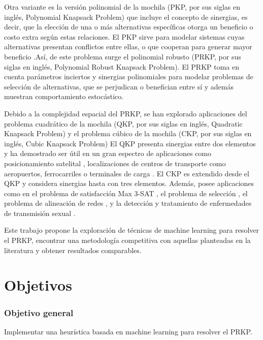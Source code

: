 \documentclass[spanish, a4paper, 12pt, openany,final]{book}
\begin{document}
Otra variante es la versión polinomial de la mochila (PKP, por sus siglas en inglés, Polynomial Knapsack Problem) que incluye el concepto de sinergias, es decir, que la elección de una o más alternativas específicas otorga un beneficio o costo extra según estas relaciones. El PKP sirve para modelar sistemas cuyas alternativas presentan conflictos entre ellas, o que cooperan para generar mayor beneficio \citep{baldo_polynomial_2023}.Así, de este problema surge el polinomial robusto (PRKP, por sus siglas en inglés, Polynomial Robust Knapsack Problem). El PRKP toma en cuenta parámetros inciertos y sinergias polinomiales para modelar problemas de selección de alternativas, que se perjudican o benefician entre sí y además muestran comportamiento estocástico.

Debido a la complejidad espacial del PRKP, se han explorado aplicaciones del problema cuadrático de la mochila (QKP, por sus siglas en inglés, Quadratic Knapsack Problem) \citep{gallo_quadratic_1980} y el problema cúbico de la mochila (CKP, por sus siglas en inglés, Cubic Knapsack Problem) \citep{forrester_strengthening_2022} El QKP presenta sinergias entre dos elementos y ha demostrado ser útil en un gran espectro de aplicaciones como posicionamiento satelital \citep{witzgall_mathematical_1975}, localizaciones de centros de transporte como aeropuertos, ferrocarriles o terminales de carga \citep{rhys_selection_1970}. El CKP es extendido desde el QKP y considera sinergias hasta con tres elementos. Además, posee aplicaciones como en el problema de satisfacción Max 3-SAT \citep{kofler_penalty_2014}, el problema de selección \citep{gallo_fast_1989}, el problema de alineación de redes \citep{mohammadi_triangular_2017}, y la detección y tratamiento de enfermedades de transmisión sexual \citep{zhao_treatments_2008}.

Este trabajo propone la exploración de técnicas de machine learning para resolver el PRKP, encontrar una metodología competitiva con aquellas planteadas en la literatura y obtener resultados comparables.

\section{Objetivos}
\subsubsection*{Objetivo general}
Implementar una heurística basada en machine learning para resolver el PRKP.
\end{document}
